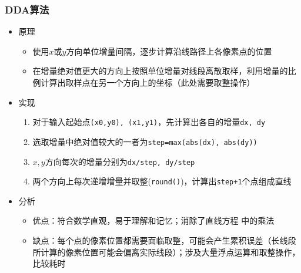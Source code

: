 \documentclass[a4paper,UTF8]{article}
\theoremstyle{definition}
\begin{document}
\subsubsection{DDA算法}
\begin{itemize}
  \item 原理
  \begin{itemize}
    \item 使用$x$或$y$方向单位增量间隔，逐步计算沿线路径上各像素点的位置
    \item 在增量绝对值更大的方向上按照单位增量对线段离散取样，利用增量的比例计算出取样点在另一个方向上的坐标（此处需要取整操作）
  \end{itemize}
  \item 实现\cite{ddawiki}
  \begin{enumerate}
    \item 对于输入起始点\texttt{(x0,y0), (x1,y1)}，先计算出各自的增量\texttt{dx, dy}
    \item 选取增量中绝对值较大的一者为\texttt{step=max(abs(dx), abs(dy))}
    \item $x,y$方向每次的增量分别为\texttt{dx/step, dy/step}
    \item 两个方向上每次递增增量并取整(\texttt{round()})，计算出\texttt{step+1}个点组成直线
  \end{enumerate}
  \item 分析
  \begin{itemize}
    \item 优点：符合数学直观，易于理解和记忆；消除了直线方程 中的乘法
    \item 缺点：每个点的像素位置都需要面临取整，可能会产生累积误差（长线段所计算的像素位置可能会偏离实际线段）；涉及大量浮点运算和取整操作，比较耗时
  \end{itemize}
\end{itemize}

\end{document}
